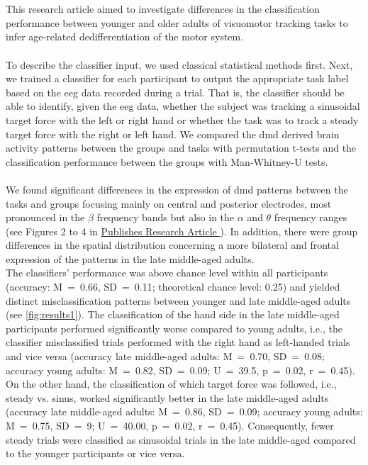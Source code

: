 \hyperref[pub:paperI]{}\\
\\
This research article aimed to investigate differences in the classification performance between younger and older adults of visuomotor tracking tasks to infer age-related dedifferentiation of the motor system.\\
\\
To describe the classifier input, we used classical statistical methods first. Next, we trained a classifier for each participant to output the appropriate task label based on the \gls{eeg} data recorded during a trial. That is, the classifier should be able to identify, given the \gls{eeg} data, whether the subject was tracking a sinusoidal target force with the left or right hand or whether the task was to track a steady target force with the right or left hand. We compared the \gls{dmd} derived brain activity patterns between the groups and tasks with permutation t-tests and the classification performance between the groups with Man-Whitney-U tests.\\
\\
We found significant differences in the expression of \gls{dmd} patterns between the tasks and groups focusing mainly on central and posterior electrodes, most pronounced in the $\beta$ frequency bands but also in the $\alpha$ and $\theta$ frequency ranges (see Figures 2 to 4 in \hyperref[pub:paperI]{Publishes Research Article }). In addition, there were group differences in the spatial distribution concerning a more bilateral and frontal expression of the patterns in the late middle-aged adults.\\
The classifiers' performance was above chance level within all participants (accuracy: M~=~0.66, SD~=~0.11; theoretical chance level: 0.25) and yielded distinct misclassification patterns between younger and late middle-aged adults (see \autoref{fig:results1}). The classification of the hand side in the late middle-aged participants performed significantly worse compared to young adults, i.e., the classifier misclassified trials performed with the right hand as left-handed trials and vice versa (accuracy late middle-aged adults: M~=~0.70, SD~=~0.08; accuracy young adults: M~=~0.82, SD~=~0.09; U~=~39.5, p~=~0.02, r~=~0.45). On the other hand, the classification of which target force was followed, i.e., steady vs. sinus, worked significantly better in the late middle-aged adults (accuracy late middle-aged adults: M~=~0.86, SD~=~0.09; accuracy young adults: M~=~0.75, SD~=~9; U~=~40.00, p~=~0.02, r~=~0.45). Consequently, fewer steady trials were classified as sinusoidal trials in the late middle-aged compared to the younger participants or vice versa.

